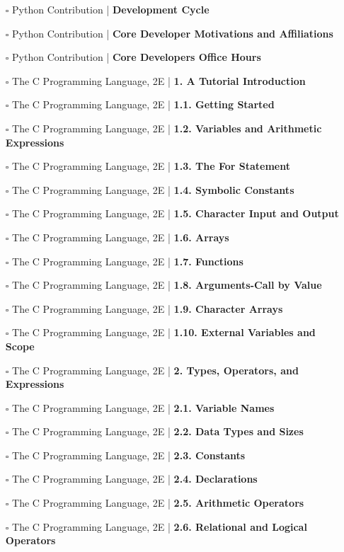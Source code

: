 \documentclass[a4, landscape, 12pt]{article}
\newcommand{\checkbox}{$\square$}%
\begin{document}
\begin{itemize}
{}
\item [\checkbox]  Python Contribution | \textbf{ Development Cycle
}
\item [\checkbox]  Python Contribution | \textbf{ Core Developer Motivations and Affiliations
}
\item [\checkbox]  Python Contribution | \textbf{ Core Developers Office Hours
}
\item [\checkbox]  The C Programming Language, 2E | \textbf{ 1. A Tutorial Introduction
}
\item [\checkbox]  The C Programming Language, 2E | \textbf{ 1.1. Getting Started
}
\item [\checkbox]  The C Programming Language, 2E | \textbf{ 1.2. Variables and Arithmetic Expressions
}
\item [\checkbox]  The C Programming Language, 2E | \textbf{ 1.3. The For Statement
}
\item [\checkbox]  The C Programming Language, 2E | \textbf{ 1.4. Symbolic Constants
}
\item [\checkbox]  The C Programming Language, 2E | \textbf{ 1.5. Character Input and Output
}
\item [\checkbox]  The C Programming Language, 2E | \textbf{ 1.6. Arrays
}
\item [\checkbox]  The C Programming Language, 2E | \textbf{ 1.7. Functions
}
\item [\checkbox]  The C Programming Language, 2E | \textbf{ 1.8. Arguments-Call by Value
}
\item [\checkbox]  The C Programming Language, 2E | \textbf{ 1.9. Character Arrays
}
\item [\checkbox]  The C Programming Language, 2E | \textbf{ 1.10. External Variables and Scope
}
\item [\checkbox]  The C Programming Language, 2E | \textbf{ 2. Types, Operators, and Expressions
}
\item [\checkbox]  The C Programming Language, 2E | \textbf{ 2.1. Variable Names
}
\item [\checkbox]  The C Programming Language, 2E | \textbf{ 2.2. Data Types and Sizes
}
\item [\checkbox]  The C Programming Language, 2E | \textbf{ 2.3. Constants
}
\item [\checkbox]  The C Programming Language, 2E | \textbf{ 2.4. Declarations
}
\item [\checkbox]  The C Programming Language, 2E | \textbf{ 2.5. Arithmetic Operators
}
\item [\checkbox]  The C Programming Language, 2E | \textbf{ 2.6. Relational and Logical Operators
}
\end{itemize}
\end{document}
